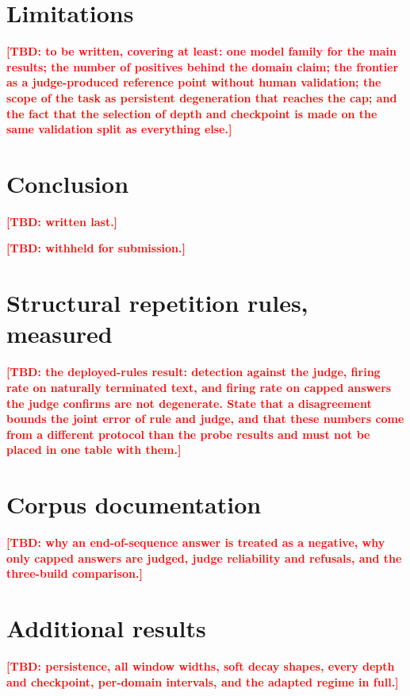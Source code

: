 \documentclass{article}
\newcommand{\TBD}[1]{\textcolor{red}{\textbf{[TBD: #1]}}}
\begin{document}
\section{Limitations}
\label{sec:limitations}

\TBD{to be written, covering at least: one model family for the main results; the
number of positives behind the domain claim; the frontier as a judge-produced
reference point without human validation; the scope of the task as persistent
degeneration that reaches the cap; and the fact that the selection of depth and
checkpoint is made on the same validation split as everything else.}

\section{Conclusion}
\TBD{written last.}

\begin{ack}
\TBD{withheld for submission.}
\end{ack}




\appendix

\section{Structural repetition rules, measured}
\TBD{the deployed-rules result: detection against the judge, firing rate on
naturally terminated text, and firing rate on capped answers the judge confirms
are not degenerate. State that a disagreement bounds the joint error of rule and
judge, and that these numbers come from a different protocol than the probe
results and must not be placed in one table with them.}

\section{Corpus documentation}
\TBD{why an end-of-sequence answer is treated as a negative, why only capped
answers are judged, judge reliability and refusals, and the three-build
comparison.}

\section{Additional results}
\TBD{persistence, all window widths, soft decay shapes, every depth and
checkpoint, per-domain intervals, and the adapted regime in full.}
\end{document}
